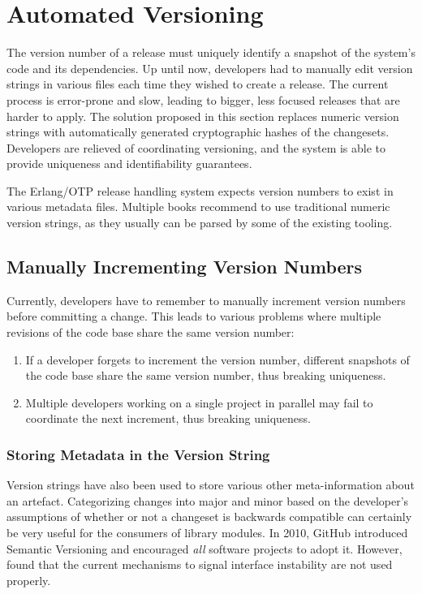 \section{Automated Versioning}

The version number of a release must uniquely identify a snapshot of the system's code and its dependencies. Up until now, developers had to manually edit version strings in various files each time they wished to create a release. The current process is error-prone and slow, leading to bigger, less focused releases that are harder to apply. The solution proposed in this section replaces numeric version strings with automatically generated cryptographic hashes of the changesets. Developers are relieved of coordinating versioning, and the system is able to provide uniqueness and identifiability guarantees.

The Erlang/OTP release handling system expects version numbers to exist in various metadata files. Multiple books recommend to use traditional numeric version strings, as they usually can be parsed by some of the existing tooling.\cite[252, 322]{logan:otp, cesarini:otp, ferd}

\subsection{Manually Incrementing Version Numbers}
Currently, developers have to remember to manually increment version numbers before committing a change. This leads to various problems where multiple revisions of the code base share the same version number:

\begin{enumerate}
  \item If a developer forgets to increment the version number, different snapshots of the code base share the same version number, thus breaking uniqueness.
  \item Multiple developers working on a single project in parallel may fail to coordinate the next increment, thus breaking uniqueness.
\end{enumerate}

\subsubsection{Storing Metadata in the Version String}
Version strings have also been used to store various other meta-information about an artefact. Categorizing changes into major and minor based on the developer's assumptions of whether or not a changeset is backwards compatible can certainly be very useful for the consumers of library modules. In 2010, GitHub introduced Semantic Versioning and encouraged \emph{all} software projects to adopt it. However, \cite{rae:semver} found that the current mechanisms to signal interface instability are not used properly.

